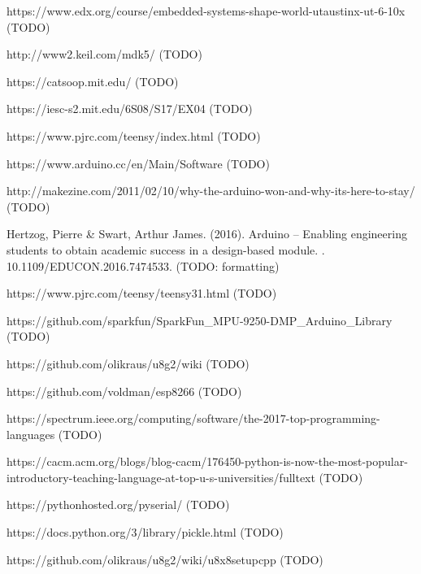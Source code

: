 \documentclass[12pt]{article}
\begin{document}
\newpage
\begin{thebibliography}{}
https://www.edx.org/course/embedded-systems-shape-world-utaustinx-ut-6-10x (TODO)

http://www2.keil.com/mdk5/ (TODO)

https://catsoop.mit.edu/ (TODO)

https://iesc-s2.mit.edu/6S08/S17/EX04 (TODO)

https://www.pjrc.com/teensy/index.html (TODO)

https://www.arduino.cc/en/Main/Software (TODO)

http://makezine.com/2011/02/10/why-the-arduino-won-and-why-its-here-to-stay/ (TODO)

Hertzog, Pierre \& Swart, Arthur James. (2016). Arduino -- Enabling engineering students to obtain academic success in a design-based module. . 10.1109/EDUCON.2016.7474533. (TODO: formatting)

https://www.pjrc.com/teensy/teensy31.html (TODO)

https://github.com/sparkfun/SparkFun\_MPU-9250-DMP\_Arduino\_Library (TODO)

https://github.com/olikraus/u8g2/wiki (TODO)

https://github.com/voldman/esp8266 (TODO)

https://spectrum.ieee.org/computing/software/the-2017-top-programming-languages (TODO)

https://cacm.acm.org/blogs/blog-cacm/176450-python-is-now-the-most-popular-introductory-teaching-language-at-top-u-s-universities/fulltext (TODO)

https://pythonhosted.org/pyserial/ (TODO)

https://docs.python.org/3/library/pickle.html (TODO)

https://github.com/olikraus/u8g2/wiki/u8x8setupcpp (TODO)

\end{thebibliography}
\end{document}
